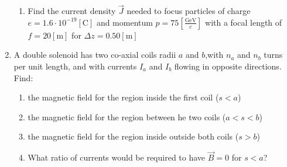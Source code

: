 \begin{enumerate}
\begin{enumerate}
      \item Find the current density $\vec{J}$ needed to focus particles of charge $e=1.6\cdot10^{−19}[\si{\coulomb}]$ and momentum $p=75\left[ \frac{\si{\giga\eV}}{c} \right]$ with a focal length of $f=20 [\si{\meter}]$ for $\Delta z=0.50[\si{\meter}]$

    \end{enumerate}

  \item A double solenoid has two co-axial coils radii $a$ and $b$,with $n_a$ and $n_b$ turns per unit length, and with currents $I_a$ and $I_b$ flowing in opposite directions. Find:

    \begin{enumerate}

      \item the magnetic field for the region inside the first coil ($s<a$)

      \item the magnetic field for the region between he two coils ($a<s<b$)

      \item the magnetic field for the region inside outside both coils ($s>b$)

      \item What ratio of currents would be required to have $\vec{B}=0$ for $s<a$?

    \end{enumerate}

\end{enumerate}



